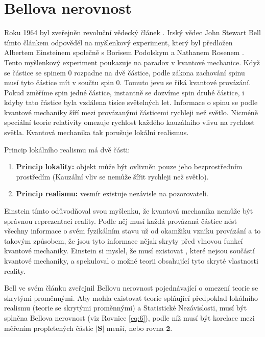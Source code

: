 \section{Bellova nerovnost}

Roku 1964 byl zveřejněn revoluční vědecký článek \parencite{bellineq}. Irský vědec John Stewart Bell tímto článkem odpověděl na myšlenkový experiment, který byl předložen Albertem Einsteinem společně s Borisem Podolskym a Nathanem Rosenem \parencite*{eprpar}. Tento myšlenkový experiment poukazuje na paradox v kvantové mechanice. Když se částice se spinem 0 rozpadne na dvě částice, podle zákona zachování spinu musí tyto částice mít v součtu spin 0. Tomuto jevu se říká kvantové provázání. Pokud změříme spin jedné částice, instantně se dozvíme spin druhé částice, i kdyby tato částice byla vzdálena tisíce světelných let. Informace o spinu se podle kvantové mechaniky šíří mezi provázanými částicemi rychleji než světlo. Nicméně speciální teorie relativity omezuje rychlost každého kauzálního vlivu na rychlost světla. Kvantová mechanika tak porušuje lokální realismus.

Princip lokálního realismu má dvě části:
    \begin{enumerate}
        \item \textbf{Princip lokality:} objekt může být ovlivněn pouze jeho bezprostředním prostředím (Kauzální vliv se nemůže šířit rychleji než světlo). \parencite{lokalita}
        \item \textbf{Princip realismu:} vesmír existuje nezávisle na pozorovateli. \parencite{realismus}
    \end{enumerate}
    
Einstein tímto odůvodňoval svou myšlenku, že kvantová mechanika nemůže být správnou reprezentací reality. Podle něj musí každá provázaná částice nést všechny informace o svém fyzikálním stavu už od okamžiku vzniku provázání a to takovým způsobem, že jsou tyto informace nějak skryty před vlnovou funkcí kvantové mechaniky. Einstein si myslel, že musí existovat , které nejsou součástí kvantové mechaniky, a spekuloval o možné teorii obsahující tyto skryté vlastnosti reality.

Bell ve svém článku \parencite*{bellineq} zveřejnil Bellovu nerovnost pojednávající o omezení teorie se skrytými proměnnými. Aby mohla existovat teorie splňující předpoklad lokálního realismu (teorie se skrytými proměnnými) a Statistické Nezávislosti, musí být splněna Bellova nerovnost (viz Rovnice \ref{eq:6}), podle níž musí být korelace mezi měřením propletených částic $\bm{|S|}$ menší, nebo rovna $\bm{2}$.

